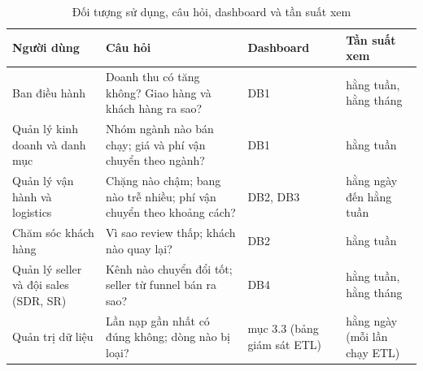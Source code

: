\begin{table}[htbp]\centering\scriptsize\caption{Đối tượng sử dụng, câu hỏi, dashboard và tần suất xem}\label{tab:doi-tuong}
\begin{tabular}{p{3.36cm}p{5.61cm}p{1.68cm}p{3.36cm}}\toprule
\textbf{Người dùng} & \textbf{Câu hỏi} & \textbf{Dashboard} & \textbf{Tần suất xem}\\\midrule
Ban điều hành & Doanh thu có tăng không? Giao hàng và khách hàng ra sao? & DB1 & hằng tuần, hằng tháng\\
Quản lý kinh doanh và danh mục & Nhóm ngành nào bán chạy; giá và phí vận chuyển theo ngành? & DB1 & hằng tuần\\
Quản lý vận hành và logistics & Chặng nào chậm; bang nào trễ nhiều; phí vận chuyển theo khoảng cách? & DB2, DB3 & hằng ngày đến hằng tuần\\
Chăm sóc khách hàng & Vì sao review thấp; khách nào quay lại? & DB2 & hằng tuần\\
Quản lý seller và đội sales (SDR, SR) & Kênh nào chuyển đổi tốt; seller từ funnel bán ra sao? & DB4 & hằng tuần, hằng tháng\\
Quản trị dữ liệu & Lần nạp gần nhất có đúng không; dòng nào bị loại? & mục 3.3 (bảng giám sát ETL) & hằng ngày (mỗi lần chạy ETL)\\
\bottomrule\end{tabular}\end{table}
